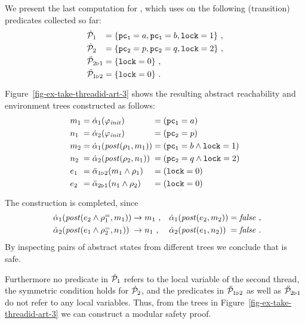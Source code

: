 We present the last \aret computation for \TakeLockBit, which uses on
the following (transition) predicates collected so far:
%
\begin{equation*}
  \begin{array}[t]{l@{\arrSpace}l}
    \artPreds_1 &= \set{\pcone=a, \pcone=b, \lock=1}\ ,\\[\jot]
    \artPreds_2 &= \set{\pctwo=p, \pctwo=q, \lock=2}\ ,\\[\jot]
    \artTPreds_{\envFromTo{2}{1}} &= \set{\lock=0}\ ,\\[\jot]
    \artTPreds_{\envFromTo{1}{2}} &= \set{\lock=0}\ .\\[\jot]
  \end{array}
\end{equation*}
%
Figure~\ref{fig-ex-take-threadid-art-3} shows the resulting abstract
reachability and environment trees constructed as follows:
%
\begin{equation*}
  \begin{array}[t]{l@{\;=\;}l@{\;=\;}l}
    m_1 & \abst_1(\SymbInit) &  (\pcone=a) \\[\jot] 
    n_1 & \abst_2(\SymbInit) &  (\pctwo=p) \\[\jot]
    m_2 & \abst_1(\post(\rel_1, m_1)) & (\pcone=b \land \lock = 1)\\[\jot]
    n_2 & \abst_2(\post(\rel_2, n_1)) & (\pctwo=q \land \lock = 2)\\[\jot]
    e_1 & \abstTransTIdOf{1}{2}(m_1 \land \rel_1) & (\lock = 0) \\[\jot]
    e_2 & \abstTransTIdOf{2}{1}(n_1 \land \rel_2) & (\lock = 0)  \\[\jot]
  \end{array}
\end{equation*}
%
The \aret construction is completed, since
\begin{equation*}
\begin{array}[t]{l@{\;\limplies\;}ll@{\;=\;}l@{}}
    \abst_1(\post(e_2 \land \relLocEqOf{1}, m_1)) & m_1\ ,
    & \abst_1(\post(e_2, m_2)) & \lfalse\ ,\\[\jot] 
    \abst_2(\post(e_1 \land \relLocEqOf{2}, n_1)) & n_1\ ,
    &
    \abst_2(\post(e_1, n_2)) & \lfalse\ .
  \end{array}
\end{equation*}
%
By inspecting pairs of abstract states from different trees we
conclude that \TakeLockThreadId is safe.

Furthermore no predicate in $\dot{\mathcal{P}}_1$ refers to the local variable
of the second thread, the symmetric condition holds for
$\dot{\mathcal{P}}_2$, and the predicates in $\ddot{\mathcal{P}}_{1\triangleright 2}$ as well as
$\ddot{\mathcal{P}}_{2\triangleright 1}$ do not refer to any local variables.
Thus, from the trees in Figure~\ref{fig-ex-take-threadid-art-3} we can
construct a modular safety proof.




